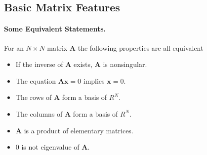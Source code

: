 \documentclass[%
oneside,                 %
final,                   %
10pt]{article}
\begin{document}
\noindent
\subsection*{Basic Matrix Features}


\paragraph{Some Equivalent Statements.}
For an $N\times N$ matrix  $\mathbf{A}$ the following properties are all equivalent

\begin{itemize}
  \item If the inverse of $\mathbf{A}$ exists, $\mathbf{A}$ is nonsingular.

  \item The equation $\mathbf{Ax}=0$ implies $\mathbf{x}=0$.

  \item The rows of $\mathbf{A}$ form a basis of $R^N$.

  \item The columns of $\mathbf{A}$ form a basis of $R^N$.

  \item $\mathbf{A}$ is a product of elementary matrices.

  \item $0$ is not eigenvalue of $\mathbf{A}$.
\end{itemize}

\noindent
\end{document}
